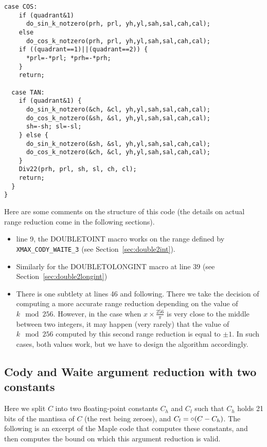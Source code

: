\begin{lstlisting}[caption={Multilevel argument reduction},firstnumber=1]
  case COS: 
    if (quadrant&1)   
      do_sin_k_notzero(prh, prl, yh,yl,sah,sal,cah,cal);
    else 
      do_cos_k_notzero(prh, prl, yh,yl,sah,sal,cah,cal);
    if ((quadrant==1)||(quadrant==2)) {
      *prl=-*prl; *prh=-*prh;
    }
    return;

  case TAN: 
    if (quadrant&1) {
      do_sin_k_notzero(&ch, &cl, yh,yl,sah,sal,cah,cal);
      do_cos_k_notzero(&sh, &sl, yh,yl,sah,sal,cah,cal);
      sh=-sh; sl=-sl;
    } else {
      do_sin_k_notzero(&sh, &sl, yh,yl,sah,sal,cah,cal);
      do_cos_k_notzero(&ch, &cl, yh,yl,sah,sal,cah,cal);
    }
    Div22(prh, prl, sh, sl, ch, cl);
    return;
  }
}

\end{lstlisting}
 

Here are some comments on the structure of this code (the details on
actual range reduction come in the following sections).

\begin{itemize}
\item line 9, the DOUBLETOINT macro works on the range defined by
  \verb!XMAX_CODY_WAITE_3! (see Section~\ref{sec:double2int}).

\item Similarly for the DOUBLETOLONGINT macro at line 39 (see
  Section~\ref{sec:double2longint})

\item There is one subtlety at lines 46 and following. There we take
  the decision of computing a more accurate range reduction depending
  on the value of $k\mod 256$. However, in the case when
  $x\times\frac{256}{\pi}$ is very close to the middle between two
  integers, it may happen (very rarely) that the value of $k\mod 256$
  computed by this second range reduction is equal to $\pm 1$. In such
  cases, both values work, but we have to design the algorithm
  accordingly.
\end{itemize}



\subsection{Cody and Waite argument reduction with two constants}

Here we split $C$ into two floating-point constants $C_h$ and $C_l$
such that $C_h$ holds 21 bits of the mantissa of $C$ (the rest being
zeroes), and $C_l=\circ(C-C_h)$.  The following is an excerpt of the
Maple code that computes these constants, and then computes the
bound on which this argument reduction is valid.

